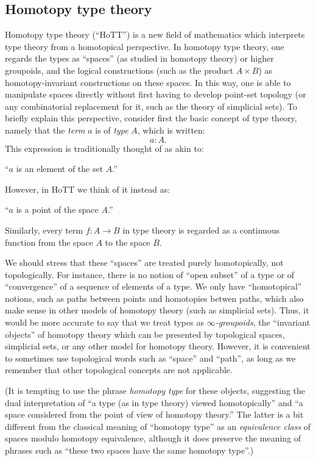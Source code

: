 {\subsection*{Homotopy type theory}

Homotopy type theory (``HoTT'') is a new field of mathematics which interprets type theory from a homotopical perspective.
In homotopy type theory, one regards the types as ``spaces'' (as studied in homotopy theory) or higher groupoids, and the logical constructions (such as the product $A\times B$) as homotopy-invariant constructions on these spaces.
In this way, one is able to manipulate spaces directly without first having to develop point-set topology (or any combinatorial replacement for it, such as the theory of simplicial sets).
To briefly explain this perspective, consider first the basic concept of type theory, namely that
the \emph{term} $a$ is of \emph{type} $A$, which is written:
$$
  a:A.
$$
This expression is traditionally thought of as akin to:
\begin{center}
``$a$ is an element of the set $A$.''
\end{center}
However, in HoTT we think of it instead as:
\begin{center}
``$a$ is a point of the space $A$.''
\end{center}
Similarly, every term $f : A\to B$ in type theory is regarded as a continuous function from the space $A$ to the space $B$.

We should stress that these ``spaces'' are treated purely homotopically, not topologically.
For instance, there is no notion of ``open subset'' of a type or of ``convergence'' of a sequence of elements of a type.
We only have ``homotopical'' notions, such as paths between points and homotopies betwen paths, which also make sense in other models of homotopy theory (such as simplicial sets).
Thus, it would be more accurate to say that we treat types as \emph{$\infty$-groupoids}, the ``invariant objects'' of homotopy theory which can be presented by topological spaces, simplicial sets, or any other model for homotopy theory.
However, it is convenient to sometimes use topological words such as ``space'' and ``path'', as long as we remember that other topological concepts are not applicable.

(It is tempting to use the phrase \emph{homotopy type} for these objects, suggesting the dual interpretation of ``a type (as in type theory) viewed homotopically'' and ``a space considered from the point of view of homotopy theory.''
The latter is a bit different from the classical meaning of ``homotopy type'' as an \emph{equivalence class} of spaces modulo homotopy equivalence, although it does preserve the meaning of phrases such as ``these two spaces have the same homotopy type''.)

}
